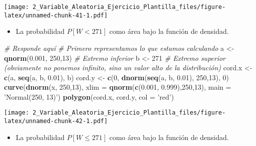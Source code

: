 \documentclass[
]{article}
\newenvironment{Shaded}{\begin{snugshade}}{\end{snugshade}}
\newcommand{\CommentTok}[1]{\textcolor[rgb]{0.56,0.35,0.01}{\textit{#1}}}
\newcommand{\DataTypeTok}[1]{\textcolor[rgb]{0.13,0.29,0.53}{#1}}
\newcommand{\DecValTok}[1]{\textcolor[rgb]{0.00,0.00,0.81}{#1}}
\newcommand{\FloatTok}[1]{\textcolor[rgb]{0.00,0.00,0.81}{#1}}
\newcommand{\KeywordTok}[1]{\textcolor[rgb]{0.13,0.29,0.53}{\textbf{#1}}}
\newcommand{\NormalTok}[1]{#1}
\newcommand{\StringTok}[1]{\textcolor[rgb]{0.31,0.60,0.02}{#1}}
\providecommand{\tightlist}{%
  \setlength{\itemsep}{0pt}\setlength{\parskip}{0pt}}
\begin{document}
\texttt{[image: 2\_Variable\_Aleatoria\_Ejercicio\_Plantilla\_files/figure-latex/unnamed-chunk-41-1.pdf]}

\begin{itemize}
\tightlist
\item
  La probabilidad \(P [W < 271]\) como área bajo la función de densidad.
\end{itemize}

\begin{Shaded}
\begin{Highlighting}[]
\CommentTok{# Responde aquí}
\CommentTok{# Primero representamos lo que estamos calculando}
\NormalTok{a <-}\StringTok{ }\KeywordTok{qnorm}\NormalTok{(}\FloatTok{0.001}\NormalTok{, }\DecValTok{250}\NormalTok{,}\DecValTok{13}\NormalTok{) }\CommentTok{# Extremo inferior}
\NormalTok{b <-}\StringTok{ }\DecValTok{271} \CommentTok{# Extremo superior (obviamente no ponemos infinito, sino un valor alto de la distribución)}
\NormalTok{cord.x <-}\StringTok{ }\KeywordTok{c}\NormalTok{(a, }\KeywordTok{seq}\NormalTok{(a, b, }\FloatTok{0.01}\NormalTok{), b) }
\NormalTok{cord.y <-}\StringTok{ }\KeywordTok{c}\NormalTok{(}\DecValTok{0}\NormalTok{, }\KeywordTok{dnorm}\NormalTok{(}\KeywordTok{seq}\NormalTok{(a, b, }\FloatTok{0.01}\NormalTok{), }\DecValTok{250}\NormalTok{,}\DecValTok{13}\NormalTok{), }\DecValTok{0}\NormalTok{) }
\KeywordTok{curve}\NormalTok{(}\KeywordTok{dnorm}\NormalTok{(x, }\DecValTok{250}\NormalTok{,}\DecValTok{13}\NormalTok{), }\DataTypeTok{xlim =} \KeywordTok{qnorm}\NormalTok{(}\KeywordTok{c}\NormalTok{(}\FloatTok{0.001}\NormalTok{, }\FloatTok{0.999}\NormalTok{),}\DecValTok{250}\NormalTok{,}\DecValTok{13}\NormalTok{), }\DataTypeTok{main =} \StringTok{'Normal(250, 13)'}\NormalTok{) }
\KeywordTok{polygon}\NormalTok{(cord.x, cord.y, }\DataTypeTok{col =} \StringTok{'red'}\NormalTok{)}
\end{Highlighting}
\end{Shaded}

\texttt{[image: 2\_Variable\_Aleatoria\_Ejercicio\_Plantilla\_files/figure-latex/unnamed-chunk-42-1.pdf]}

\begin{itemize}
\tightlist
\item
  La probabilidad \(P [W \leq 271]\) como área bajo la función de
  densidad.
\end{itemize}
\end{document}
